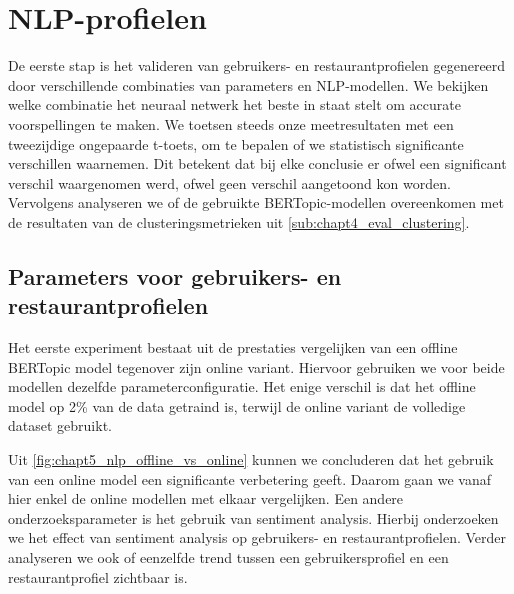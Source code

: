 \section{NLP-profielen}
\label{sub:chapt5_nlp_resultaten}
De eerste stap is het valideren van gebruikers- en restaurantprofielen gegenereerd door verschillende combinaties van parameters en NLP-modellen. We bekijken welke combinatie het neuraal netwerk het beste in staat stelt om accurate voorspellingen te maken. We toetsen steeds onze meetresultaten met een tweezijdige ongepaarde t-toets, om te bepalen of we statistisch significante verschillen waarnemen. Dit betekent dat bij elke conclusie er ofwel een significant verschil waargenomen werd, ofwel geen verschil aangetoond kon worden.\newline
Vervolgens analyseren we of de gebruikte BERTopic-modellen overeenkomen met de resultaten van de clusteringsmetrieken uit \autoref{sub:chapt4_eval_clustering}. 


\subsection{Parameters voor gebruikers- en restaurantprofielen}
\label{sub:chapt5_vergelijking_profielen}
Het eerste experiment bestaat uit de prestaties vergelijken van een offline BERTopic model tegenover zijn online variant. Hiervoor gebruiken we voor beide modellen dezelfde parameterconfiguratie. Het enige verschil is dat het offline model op 2\% van de data getraind is, terwijl de online variant de volledige dataset gebruikt.


Uit \autoref{fig:chapt5_nlp_offline_vs_online} kunnen we concluderen dat het gebruik van een online model een significante verbetering geeft. Daarom gaan we vanaf hier enkel de online modellen met elkaar vergelijken. Een andere onderzoeksparameter is het gebruik van sentiment analysis. Hierbij onderzoeken we het effect van sentiment analysis op gebruikers- en restaurantprofielen. Verder analyseren we ook of eenzelfde trend tussen een gebruikersprofiel en een restaurantprofiel zichtbaar is.

